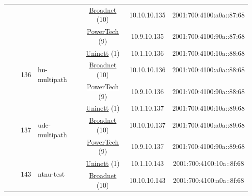 \begin{small}
\begin{center}
\begin{longtable}{|c|c|c|c|c|c|c|c|}
  &  &  &  & \multicolumn{2}{|c|}{\tiny{\href{https://www.broadnet.no}{Broadnet} (10)}} & \tiny{10.10.10.135} & \tiny{2001:700:4100:a0a::87:68} \\* \cline{5-5}\cline{6-6}\cline{7-7}\cline{8-8}
  &  &  &  & \multicolumn{2}{|c|}{\tiny{\href{http://www.powertech.no}{PowerTech} (9)}} & \tiny{10.9.10.135} & \tiny{2001:700:4100:90a::87:68} \\* \cline{3-3}\cline{4-4}\cline{5-5}\cline{6-6}\cline{7-7}\cline{8-8}
  &  & \multirow{3}{*}{\tiny{136}} & \multicolumn{1}{|l|}{\multirow{3}{*}{\tiny{hu-multipath}}} & \multicolumn{2}{|c|}{\tiny{\href{https://www.uninett.no}{Uninett} (1)}} & \tiny{10.1.10.136} & \tiny{2001:700:4100:10a::88:68} \\* \cline{5-5}\cline{6-6}\cline{7-7}\cline{8-8}
  &  &  &  & \multicolumn{2}{|c|}{\tiny{\href{https://www.broadnet.no}{Broadnet} (10)}} & \tiny{10.10.10.136} & \tiny{2001:700:4100:a0a::88:68} \\* \cline{5-5}\cline{6-6}\cline{7-7}\cline{8-8}
  &  &  &  & \multicolumn{2}{|c|}{\tiny{\href{http://www.powertech.no}{PowerTech} (9)}} & \tiny{10.9.10.136} & \tiny{2001:700:4100:90a::88:68} \\* \cline{3-3}\cline{4-4}\cline{5-5}\cline{6-6}\cline{7-7}\cline{8-8}
  &  & \multirow{3}{*}{\tiny{137}} & \multicolumn{1}{|l|}{\multirow{3}{*}{\tiny{ude-multipath}}} & \multicolumn{2}{|c|}{\tiny{\href{https://www.uninett.no}{Uninett} (1)}} & \tiny{10.1.10.137} & \tiny{2001:700:4100:10a::89:68} \\* \cline{5-5}\cline{6-6}\cline{7-7}\cline{8-8}
  &  &  &  & \multicolumn{2}{|c|}{\tiny{\href{https://www.broadnet.no}{Broadnet} (10)}} & \tiny{10.10.10.137} & \tiny{2001:700:4100:a0a::89:68} \\* \cline{5-5}\cline{6-6}\cline{7-7}\cline{8-8}
  &  &  &  & \multicolumn{2}{|c|}{\tiny{\href{http://www.powertech.no}{PowerTech} (9)}} & \tiny{10.9.10.137} & \tiny{2001:700:4100:90a::89:68} \\* \cline{3-3}\cline{4-4}\cline{5-5}\cline{6-6}\cline{7-7}\cline{8-8}
  &  & \multirow{3}{*}{\tiny{143}} & \multicolumn{1}{|l|}{\multirow{3}{*}{\tiny{ntnu-test}}} & \multicolumn{2}{|c|}{\tiny{\href{https://www.uninett.no}{Uninett} (1)}} & \tiny{10.1.10.143} & \tiny{2001:700:4100:10a::8f:68} \\* \cline{5-5}\cline{6-6}\cline{7-7}\cline{8-8}
  &  &  &  & \multicolumn{2}{|c|}{\tiny{\href{https://www.broadnet.no}{Broadnet} (10)}} & \tiny{10.10.10.143} & \tiny{2001:700:4100:a0a::8f:68} \\* \cline{5-5}\cline{6-6}\cline{7-7}\cline{8-8}

\end{longtable}
\end{center}
\end{small}
